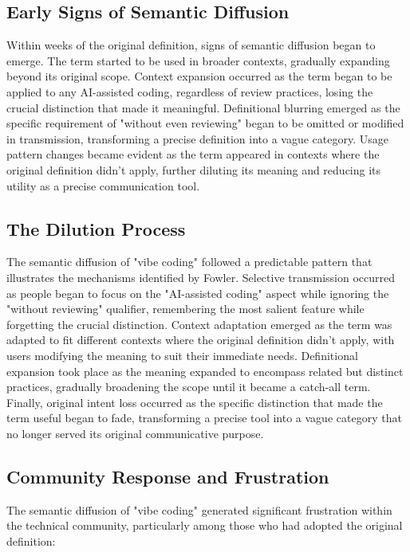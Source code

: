 \documentclass[11pt]{article}
\begin{document}
\subsection{Early Signs of Semantic Diffusion}

Within weeks of the original definition, signs of semantic diffusion began to emerge. The term started to be used in broader contexts, gradually expanding beyond its original scope. Context expansion occurred as the term began to be applied to any AI-assisted coding, regardless of review practices, losing the crucial distinction that made it meaningful. Definitional blurring emerged as the specific requirement of "without even reviewing" began to be omitted or modified in transmission, transforming a precise definition into a vague category. Usage pattern changes became evident as the term appeared in contexts where the original definition didn't apply, further diluting its meaning and reducing its utility as a precise communication tool.

\subsection{The Dilution Process}

The semantic diffusion of "vibe coding" followed a predictable pattern that illustrates the mechanisms identified by Fowler. Selective transmission occurred as people began to focus on the "AI-assisted coding" aspect while ignoring the "without reviewing" qualifier, remembering the most salient feature while forgetting the crucial distinction. Context adaptation emerged as the term was adapted to fit different contexts where the original definition didn't apply, with users modifying the meaning to suit their immediate needs. Definitional expansion took place as the meaning expanded to encompass related but distinct practices, gradually broadening the scope until it became a catch-all term. Finally, original intent loss occurred as the specific distinction that made the term useful began to fade, transforming a precise tool into a vague category that no longer served its original communicative purpose.

\subsection{Community Response and Frustration}

The semantic diffusion of "vibe coding" generated significant frustration within the technical community, particularly among those who had adopted the original definition:
\end{document}

